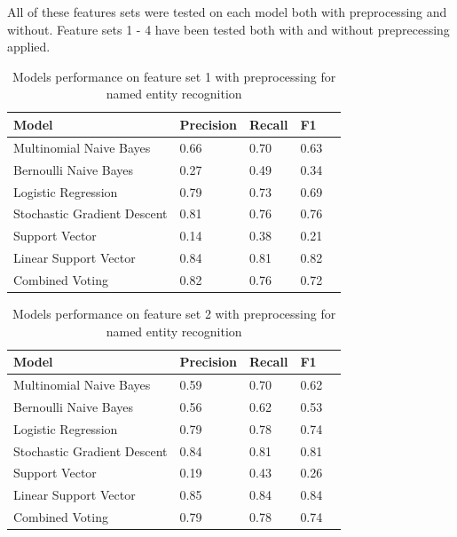 \documentclass[11pt,oneside]{book}
\begin{document}
All of these features sets were tested on each model both with preprocessing and without. Feature sets 1 - 4 have been tested both with and without preprecessing applied.

\begin{longtable}{|l|l|l|l|l|}
\caption{Models performance on feature set 1 with preprocessing for named entity recognition}
\label{tab:ner_feature_set_1}\\
\hline
\textbf{Model}          & \multicolumn{1}{c|}{\textbf{Precision}} & \multicolumn{1}{c|}{\textbf{Recall}} & \textbf{F1}  \\ \hline
\endfirsthead
%
\endhead
%
Multinomial Naive Bayes & 0.66  &  0.70   &  0.63   \\ \hline
Bernoulli Naive Bayes       & 0.27 & 0.49 & 0.34   \\ \hline
Logistic Regression         & 0.79 & 0.73 & 0.69   \\ \hline
Stochastic Gradient Descent & 0.81 & 0.76 & 0.76   \\ \hline
Support Vector              & 0.14 & 0.38 & 0.21  \\ \hline
Linear Support Vector       & 0.84 & 0.81 & 0.82  \\ \hline
Combined Voting             & 0.82 & 0.76 & 0.72  \\ \hline
\end{longtable}

\begin{longtable}{|l|l|l|l|l|}
\caption{Models performance on feature set 2 with preprocessing for named entity recognition}
\label{tab:ner_feature_set_2}\\
\hline
\textbf{Model}          & \multicolumn{1}{c|}{\textbf{Precision}} & \multicolumn{1}{c|}{\textbf{Recall}} & \textbf{F1} \\ \hline
\endfirsthead
%
\endhead
%
Multinomial Naive Bayes &  0.59  & 0.70  & 0.62 \\ \hline
Bernoulli Naive Bayes       & 0.56 & 0.62 & 0.53   \\ \hline
Logistic Regression         & 0.79 & 0.78 & 0.74  \\ \hline
Stochastic Gradient Descent & 0.84 & 0.81 & 0.81  \\ \hline
Support Vector              & 0.19 & 0.43 & 0.26  \\ \hline
Linear Support Vector       & 0.85 & 0.84 & 0.84  \\ \hline
Combined Voting             & 0.79 & 0.78 & 0.74  \\ \hline
\end{longtable}
\end{document}
